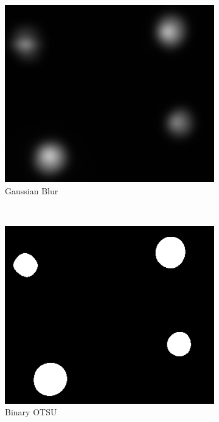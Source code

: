 \begin{figure}[!t]
\begin{subfigure}[h]{0.16\textwidth}
      \includegraphics[width=\textwidth]{pic/bbox/bbox_B_gaussianBlur_crop.png}
      \caption{Gaussian Blur} \label{fig:bbox_blur}
   \end{subfigure}%
   ~  
   \begin{subfigure}[h]{0.16\textwidth}
      \includegraphics[width=\textwidth]{pic/bbox/bbox_C_OTSU_crop.png}
      \caption{Binary OTSU} \label{fig:bbox_otsu}
   \end{subfigure}%
   ~
   \begin{subfigure}[h]{0.16\textwidth}

\end{subfigure}
\end{figure}
